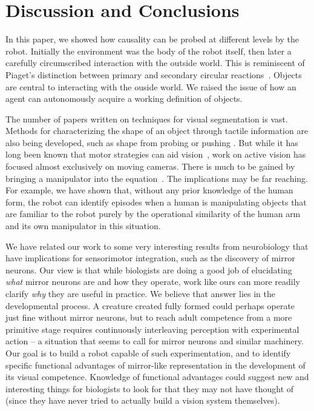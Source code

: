 
\section{Discussion and Conclusions}

In this paper, we showed how causality can be probed at different
levels by the robot.  Initially the environment was the body of the
robot itself, then later a carefully circumscribed interaction with
the outside world.  This is reminiscent of Piaget's distinction
between primary and secondary circular
reactions~\cite{ginsburg78piaget}.  Objects are central to interacting
with the ouside world.  We raised the issue of how an agent can
autonomously acquire a working definition of objects. 

The number of papers written on techniques for visual segmentation is
vast.  Methods for characterizing the shape of an object through
tactile information are also being developed, such as shape from
probing 
\cite{paulos99fast} 
or pushing
\cite{moll01reconstructing}.  
But while it has long
been known that motor strategies can aid
vision~\cite{ballard91animate}, work on active vision has focused
almost exclusively on moving cameras.  There is much to be gained by
bringing a manipulator into the equation~\cite{tsikos91segmentation}.
The implications may be far reaching.  For example,
we have shown that, without any prior knowledge of the human form, 
the robot can identify episodes when a human is manipulating objects
that are familiar to the robot purely by the operational similarity 
of the human arm and its own manipulator in this situation.

We have related our work to some very interesting results from
neurobiology that have implications for sensorimotor integration, such
as the discovery of mirror neurons.  Our view is that while biologists
are doing a good job of elucidating {\em what} mirror neurons are and
how they operate, work like ours can more readily clarify {\em why}
they are useful in practice.  We believe that answer lies in the
developmental process.  A creature created fully formed could perhaps
operate just fine without mirror neurons, but to reach adult
competence from a more primitive stage requires continuously
interleaving perception with experimental action -- a situation that
seems to call for mirror neurons and similar machinery.  Our goal is
to build a robot capable of such experimentation, and to identify
specific functional advantages of mirror-like representation in the
development of its visual competence.  Knowledge of functional
advantages could suggest new and interesting things for biologists to
look for that they may not have thought of (since they have never
tried to actually build a vision system themselves).


